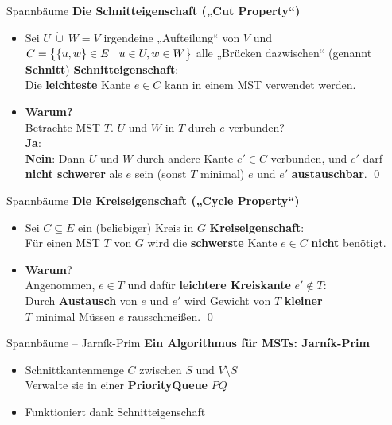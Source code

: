 \begin{frame}{Spannbäume} %
	\textbf{Die Schnitteigenschaft („Cut Property“)} 
	\begin{itemize}
		\item Sei $U\ \dot{\cup}\ W = V$ irgendeine „Aufteilung“ von $V$ und $C = \big\lbrace \{u, w\} \in E \bigm| u \in U, w \in W \big\rbrace$ alle „Brücken dazwischen“ (genannt \textbf{Schnitt})
		\pause
		\implitem \textbf{Schnitteigenschaft}: \\ 
		Die \textbf{leichteste} Kante $e \in C$ kann in einem MST verwendet werden.
		\pause 
		\item \textbf{Warum?} \\
		\pause \impl Betrachte MST $T$. $U$ und $W$ in $T$ durch $e$ verbunden? \\
		\impl \textbf{Ja}: \yop \\
		\impl \textbf{Nein}: Dann $U$ und $W$ durch andere Kante $e' \in C$ verbunden, und $e'$ darf \textbf{nicht schwerer} als $e$ sein (sonst \crash $T$ minimal) \impl $e$ und $e'$ \textbf{austauschbar}. \qed
	\end{itemize}
\end{frame}


\begin{frame}{Spannbäume}
	\textbf{Die Kreiseigenschaft („Cycle Property“)} 
	\begin{itemize}
		\item Sei $C \subseteq E$ ein  (beliebiger) Kreis in $G$
		\pause
		\implitem \textbf{Kreiseigenschaft}: \\ 
		Für einen MST $T$ von $G$ wird die \textbf{schwerste} Kante $e \in C$ \textbf{nicht} benötigt.
		\pause 
		\item \textbf{Warum}? \\
		\pause \impl Angenommen, $e \in T$ und dafür \textbf{leichtere Kreiskante} $e' \notin T$: \\
		Durch \textbf{Austausch} von $e$ und $e'$ wird Gewicht von $T$ \textbf{kleiner} \\ 
		\impl \crash $T$ minimal \impl Müssen $e$ rausschmeißen. \qed
	\end{itemize}
\end{frame}


\begin{frame}{Spannbäume – Jarník-Prim}
	\textbf{Ein Algorithmus für MSTs: Jarník-Prim} 
	\begin{itemize}
		\implitem \textbf{Idee}: Schnitteigenschaft irgendwie ausnutzen! \\
		. Starte ab beliebigem $s \in V$, setze $S := \{s\}$ \\
		2. \textbf{Erweitere} Knotenmenge $S$ und Baum $T$ \textbf{schrittweise} um die \textbf{minimale} Verbindungskante zu $\ V \setminus S$
		\pause
		\item Schnittkantenmenge $C$ zwischen $S$ und $V \setminus S$ \\
		\impl Verwalte sie in einer \textbf{PriorityQueue} $PQ$
		\pause
		\item[\yop] Funktioniert dank Schnitteigenschaft
	\end{itemize}
\end{frame}

